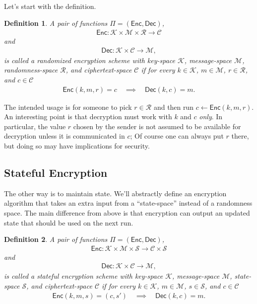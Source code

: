\documentclass[11pt]{article}
\newtheorem{definition}{Definition}
\newcommand{\msgs}{\mathcal{M}}
\newcommand{\ctxts}{\mathcal{C}}
\newcommand{\keys}{\mathcal{K}}
\newcommand{\rands}{\mathcal{R}}
\newcommand{\states}{\mathcal{S}}
\newcommand{\Enc}{\mathsf{Enc}}
\newcommand{\Dec}{\mathsf{Dec}}
\begin{document}
Let's start with the definition.
\begin{definition}
    A pair of functions $\Pi=(\Enc,\Dec)$,
    \begin{align*}
        \Enc  : \keys\times\msgs\times\rands  \to  \ctxts 
    \end{align*}
    and
    \begin{align*}
        \Dec : \keys\times\ctxts \to \msgs,  
    \end{align*}
    is called a \emph{randomized encryption scheme with key-space $\keys$,
    message-space $\msgs$, randomness-space $\rands$, and ciphertext-space
    $\ctxts$} if for every $k\in\keys$, $m\in\msgs$, $r\in\rands$, and
    $c\in\ctxts$
    \begin{align*}
        \Enc(k,m,r)=c \quad \implies \quad \Dec(k,c)=m.
    \end{align*}
\end{definition}
The intended usage is for someone to pick $r\in\rands$ and then run
$c\gets\Enc(k,m,r)$. An interesting point is that decryption must work with $k$
and $c$ \emph{only}. In particular, the value $r$ chosen by the sender is not
assumed to be available for decryption unless it is communicated in $c$; Of
course one can always put $r$ there, but doing so may have implications for
security.

\subsection{Stateful Encryption}

The other way is to maintain state. We'll abstractly define an encryption
algorithm that takes an extra input from a ``state-space'' instead of a
randomness space. The main difference from above is that encryption can output
an updated state that should be used on the next run.
\begin{definition}
    A pair of functions $\Pi=(\Enc,\Dec)$,
    \begin{align*}
        \Enc  : \keys\times\msgs\times\states  \to  \ctxts\times\states
    \end{align*}
    and
    \begin{align*}
        \Dec : \keys\times\ctxts \to \msgs,  
    \end{align*}
    is called a \emph{stateful encryption scheme with key-space $\keys$,
    message-space $\msgs$, state-space $\states$, and ciphertext-space
    $\ctxts$} if for every $k\in\keys$, $m\in\msgs$, $s\in\states$,
    and $c\in\ctxts$
    \begin{align*}
        \Enc(k,m,s)=(c,s') \quad \implies \quad \Dec(k,c)=m.
    \end{align*}
\end{definition}
\end{document}
